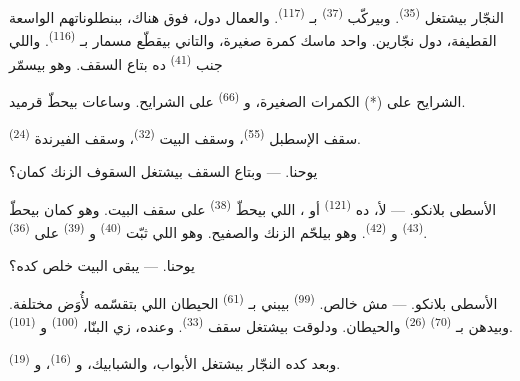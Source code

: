 النجّار بيشتغل  \textsuperscript{(35)}. وبيركّب 
\textsuperscript{(37)} بـ \textsuperscript{(117)}. والعمال دول، فوق هناك،
ببنطلوناتهم الواسعة القطيفة، دول نجّارين. واحد ماسك كمرة صغيرة، والتاني
بيقطّع مسمار بـ \textsuperscript{(116)}. واللي جنب 
\textsuperscript{(41)} ده بتاع السقف. وهو بيسمّر


الشرايح على (*) الكمرات الصغيرة، و \textsuperscript{(66)} على الشرايح.
وساعات بيحطّ قرميد.

سقف الإسطبل  \textsuperscript{(55)}، وسقف البيت 
\textsuperscript{(32)}، وسقف الفيرندة  \textsuperscript{(24)}.

\textsc{يوحنا}. --- وبتاع السقف بيشتغل السقوف الزنك كمان؟

\textsc{الأسطى بلانكو}. --- لأ، ده  \textsuperscript{(121)} أو
، اللي بيحطّ  \textsuperscript{(38)} على سقف البيت.
وهو كمان بيحطّ  \textsuperscript{(43)} و
\textsuperscript{(42)}. وهو بيلحّم الزنك والصفيح. وهو اللي ثبّت  \textsuperscript{(40)} و \textsuperscript{(39)} على
\textsuperscript{(36)}.

\textsc{يوحنا}. --- يبقى البيت خلص كده؟

\VUsaut{3.0mm}
\VUsaut{3.0mm}

\textsc{الأسطى بلانكو}. --- مش خالص.  \textsuperscript{(99)} بيبني
بـ \textsuperscript{(61)} الحيطان اللي بتقسّمه لأُوَض مختلفة. وبيدهن
بـ \textsuperscript{(70)}  \textsuperscript{(26)} والحيطان.
ودلوقت
بيشتغل سقف  \textsuperscript{(33)}. وعنده، زي البنّا،
 \textsuperscript{(100)} و \textsuperscript{(101)}.

وبعد كده النجّار بيشتغل الأبواب، والشبابيك، و
\textsuperscript{(16)}، و \textsuperscript{(19)}.

